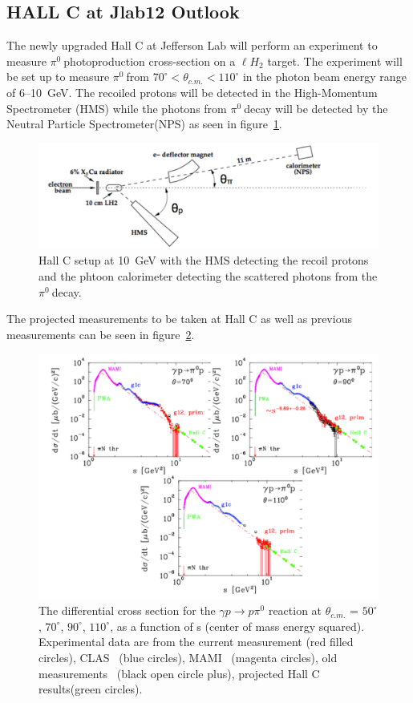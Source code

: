 \documentclass{aip-cp}
\def\piz{$\pi^{0}\ $}
\begin{document}
\subsection{HALL C at Jlab12 Outlook}
The newly upgraded Hall C at Jefferson Lab will perform an experiment to measure \piz photoproduction cross-section on a $\ell H_2$ target. The experiment will be set up to measure \piz from $70^{\circ}<\theta_{c.m.}<110^{\circ}$ in the photon beam energy range of 6--10~GeV. The recoiled protons will be detected in the High-Momentum Spectrometer (HMS) while the photons from \piz decay will be detected by the Neutral Particle Spectrometer(NPS) as seen in figure~\ref{fig:hallc12}.
\begin{figure}[h]
	\centerline{\includegraphics[width=250 pt, height = 100 pt]{figures/HALLC12.pdf}}
	\caption{Hall C setup at 10~GeV with the HMS detecting the recoil protons and the phtoon calorimeter detecting the scattered photons from the \piz decay. }
	\label{fig:hallc12}
\end{figure}
The projected measurements to be taken at Hall C as well as previous measurements can be seen in figure~\ref{fig:pi0_projected}.
\begin{figure}[h]
	\centerline{\includegraphics[width=300 pt, height = 160 pt]{figures/HallC_projected.pdf}}
	\caption{The differential cross section for the $\gamma p \to p \pi^0$ reaction at $\theta_{c.m.}$ = $50^{\circ}$, $70^{\circ}$, $90^{\circ}$, $110^{\circ}$, as a function of s (center of mass energy squared). Experimental data are from the current measurement (red filled circles), CLAS~\protect\cite{Dugger07,Dugger13} (blue circles), MAMI~\protect\cite{beck} (magenta circles), old measurements~\protect\cite{Joos,Fuchs} (black open circle plus), projected Hall C results(green circles). }
	\label{fig:pi0_projected}
\end{figure}
\newpage

\nocite{*}
%
%
\end{document}
